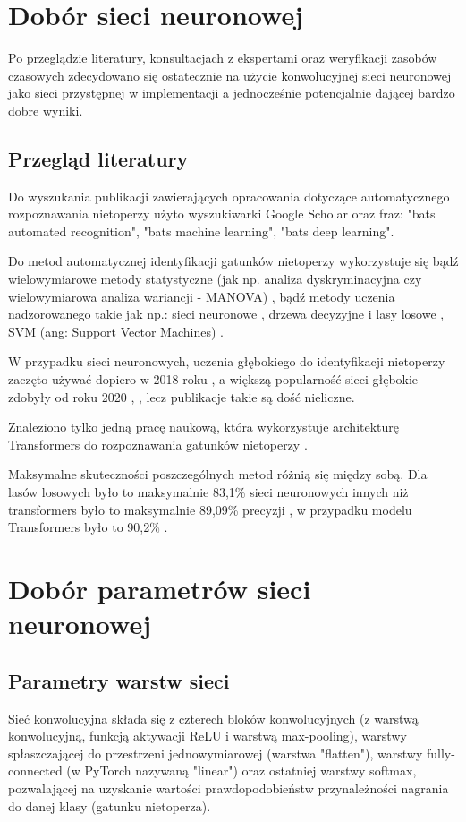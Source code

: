 \documentclass{sprz}
\begin{document}
\section{Dobór sieci neuronowej}
Po przeglądzie literatury, konsultacjach z ekspertami oraz weryfikacji zasobów czasowych zdecydowano się ostatecznie na użycie konwolucyjnej sieci neuronowej jako sieci przystępnej w implementacji a jednocześnie potencjalnie dającej bardzo dobre wyniki.

\subsection{Przegląd literatury}
Do wyszukania publikacji zawierających opracowania dotyczące automatycznego rozpoznawania nietoperzy użyto wyszukiwarki Google Scholar oraz fraz: "bats automated recognition", "bats machine learning", "bats deep learning".

Do metod automatycznej identyfikacji gatunków nietoperzy wykorzystuje się
bądź wielowymiarowe metody statystyczne (jak np. analiza dyskryminacyjna czy wielowymiarowa analiza wariancji - MANOVA) \cite{bats-id-statistics}, bądź metody uczenia nadzorowanego \cite{bats-id-supervised} takie jak np.: sieci neuronowe \cite{bats-id-nn}, drzewa decyzyjne i lasy losowe \cite{bats-random-forest}, SVM (ang: Support Vector Machines) \cite{bats-id-svm}.

W przypadku sieci neuronowych, uczenia głębokiego do identyfikacji nietoperzy zaczęto używać dopiero w 2018 roku \cite{bats-id-dl2018}, a większą popularność sieci głębokie zdobyły od roku 2020 \cite{bats-id-dl2020a}, \cite{bats-id-dl2020b}, lecz publikacje takie są dość nieliczne.

Znaleziono tylko jedną pracę naukową, która wykorzystuje architekturę Transformers do rozpoznawania gatunków nietoperzy \cite{bats-transformers}.

Maksymalne skuteczności poszczególnych metod różnią się między sobą. Dla lasów losowych było to maksymalnie 83,1\% \cite{bats-id-randomforest} sieci neuronowych innych niż transformers było to maksymalnie 89,09\% precyzji \cite{bats-id-dl}, w przypadku modelu Transformers było to 90,2\% \cite{bats-transformers}.

\section{Dobór parametrów sieci neuronowej}

\subsection{Parametry warstw sieci}
Sieć konwolucyjna składa się z czterech bloków konwolucyjnych (z warstwą konwolucyjną, funkcją aktywacji ReLU i warstwą max-pooling), warstwy spłaszczającej do przestrzeni jednowymiarowej (warstwa "flatten"), warstwy fully-connected (w PyTorch nazywaną "linear") oraz ostatniej warstwy softmax, pozwalającej na uzyskanie wartości prawdopodobieństw przynależności nagrania do danej klasy (gatunku nietoperza).
\end{document}

